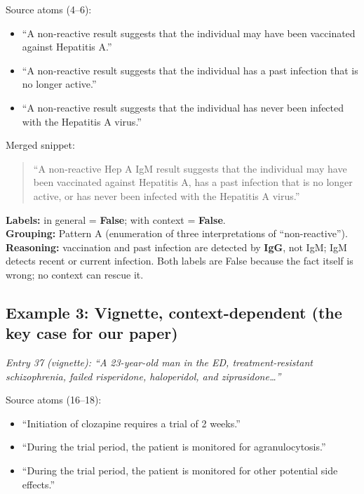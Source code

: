 \documentclass{article}
\begin{document}
\medskip
\noindent Source atoms (4--6):
\begin{itemize}[leftmargin=1.8em,labelsep=0.5em,itemsep=2pt,topsep=3pt]
    \item[\textit{atom 4:}] ``A non-reactive result suggests that the individual may have been vaccinated against Hepatitis A.''
    \item[\textit{atom 5:}] ``A non-reactive result suggests that the individual has a past infection that is no longer active.''
    \item[\textit{atom 6:}] ``A non-reactive result suggests that the individual has never been infected with the Hepatitis A virus.''
\end{itemize}

\noindent Merged snippet:
\begin{quote}
``A non-reactive Hep A IgM result suggests that the individual may have been vaccinated against Hepatitis A, has a past infection that is no longer active, or has never been infected with the Hepatitis A virus.''
\end{quote}

\noindent\textbf{Labels:} in general = \textbf{False}; with context = \textbf{False}. \\
\noindent\textbf{Grouping:} Pattern A (enumeration of three interpretations of ``non-reactive''). \\
\noindent\textbf{Reasoning:} vaccination and past infection are detected by \textbf{IgG}, not IgM; IgM detects recent or current infection. Both labels are False because the fact itself is wrong; no context can rescue it.

\subsection*{Example 3: Vignette, context-dependent (the key case for our paper)}
\textit{Entry 37 (vignette): ``A 23-year-old man in the ED, treatment-resistant schizophrenia, failed risperidone, haloperidol, and ziprasidone\ldots{}''}

\medskip
\noindent Source atoms (16--18):
\begin{itemize}[leftmargin=1.8em,labelsep=0.5em,itemsep=2pt,topsep=3pt]
    \item[\textit{atom 16:}] ``Initiation of clozapine requires a trial of 2 weeks.''
    \item[\textit{atom 17:}] ``During the trial period, the patient is monitored for agranulocytosis.''
    \item[\textit{atom 18:}] ``During the trial period, the patient is monitored for other potential side effects.''
\end{itemize}
\end{document}
